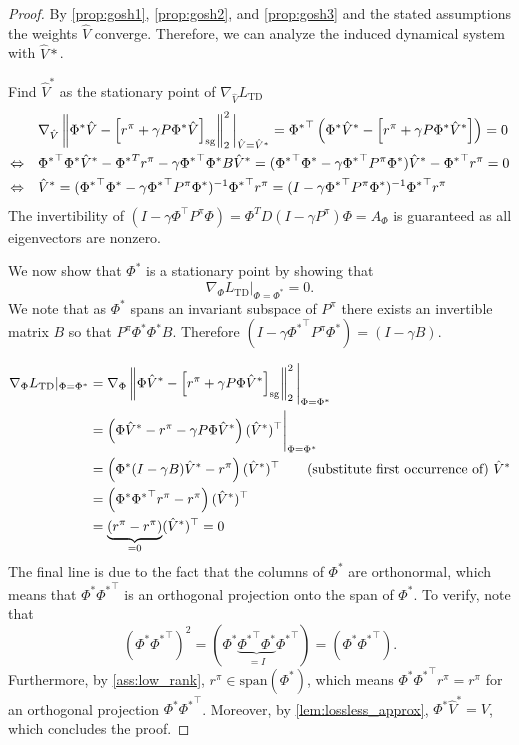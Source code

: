 \begin{proof}
    By \autoref{prop:gosh1}, \autoref{prop:gosh2}, and \autoref{prop:gosh3} and the stated assumptions the weights $\hat{V}$ converge. Therefore, we can analyze the induced dynamical system with $\hat{V}*$.

    Find $\hat{V}^*$ as the stationary point of $\nabla_{\hat{V}} L_\text{TD}$
    \begin{align*}
        & \nabla_{\hat{V}} \left\lVert \Phi^* \hat{V} - \left[r^\pi + \gamma P\Phi^* \hat{V}\right]_\text{sg} \right\rVert_2^2\bigg|_{\hat{V} = \hat{V}^*} = {\Phi^*}^\top\left(\Phi^* \hat{V}^* - \left[r^\pi + \gamma P\Phi^* \hat{V}^*\right]\right) = 0 \\
        \Leftrightarrow \quad & {\Phi^*}^\top \Phi^* \hat{V}^* - {\Phi^*}^T r^\pi - \gamma {\Phi^*}^\top  \Phi^* B \hat{V}^* = ({\Phi^*}^\top \Phi^* - \gamma {\Phi^*}^\top P^\pi \Phi^*) \hat{V}^* - {\Phi^*}^\top r^\pi = 0\\
        \Leftrightarrow \quad & \hat{V}^* = ({\Phi^*}^\top \Phi^* - \gamma {\Phi^*}^\top P^\pi \Phi^*)^{-1} {\Phi^*}^\top r^\pi = (I - \gamma {\Phi^*}^\top P^\pi \Phi^*)^{-1} {\Phi^*}^\top r^\pi
    \end{align*}
    The invertibility of $(I - \gamma \Phi^\top P^\pi \Phi) = \Phi^T D (I - \gamma P^\pi) \Phi = A_\Phi$ is guaranteed as all eigenvectors are nonzero.

    We now show that $\Phi^*$ is a stationary point by showing that $$\nabla_\Phi L_\text{TD}|_{\Phi = \Phi^*} = 0.$$ We note that as $\Phi^*$ spans an invariant subspace of $P^\pi$ there exists an invertible matrix $B$ so that $P^\pi \Phi^*  \Phi^* B$. Therefore $(I - \gamma {\Phi^*}^\top P^\pi \Phi^*) = (I - \gamma B)$.

    \begin{align*}
        \nabla_\Phi L_\text{TD}|_{\Phi = \Phi^*} & =  \nabla_{\Phi} \left\lVert \Phi \hat{V}^* - \left[r^\pi + \gamma P\Phi \hat{V}^*\right]_\text{sg} \right\rVert_2^2\Bigg|_{\Phi = \Phi^*}\\
        & = \left(\Phi \hat{V}^* - r^\pi - \gamma P\Phi {\hat{V}}^*\right) (\hat{V}^*)^\top\Bigg|_{\Phi = \Phi^*} \\
        & = \left(\Phi^* (I - \gamma B) {\hat{V}}^* - r^\pi \right)(\hat{V}^*)^\top \quad\quad \text{(substitute first occurrence of)~$\hat{V}^*$}\\
        & = \left(\Phi^* {\Phi^*}^\top r^\pi - r^\pi \right)({\hat{V}}^*)^\top\\
        & = \underbrace{\left(r^\pi - r^\pi \right)}_{=0}({\hat{V}}^*)^\top = 0
    \end{align*}
    The final line is due to the fact that the columns of $\Phi^*$ are orthonormal, which means that $\Phi^*{\Phi^*}^\top$ is an orthogonal projection onto the span of $\Phi^*$. To verify, note that $$\left(\Phi^*{\Phi^*}^\top\right)^2 = \left(\Phi^* \underbrace{{\Phi^*}^\top \Phi^*}_{=I}{\Phi^*}^\top\right) = \left(\Phi^*{\Phi^*}^\top\right).$$ Furthermore, by \autoref{ass:low_rank}, $r^\pi \in \text{span}(\Phi^*)$, which means $\Phi^*{\Phi^*}^\top r^\pi = r^\pi$ for an orthogonal projection $\Phi^*{\Phi^*}^\top$.
    Moreover, by \autoref{lem:lossless_approx}, $\Phi^* \hat{V}^* = V$, which concludes the proof.
\end{proof}

